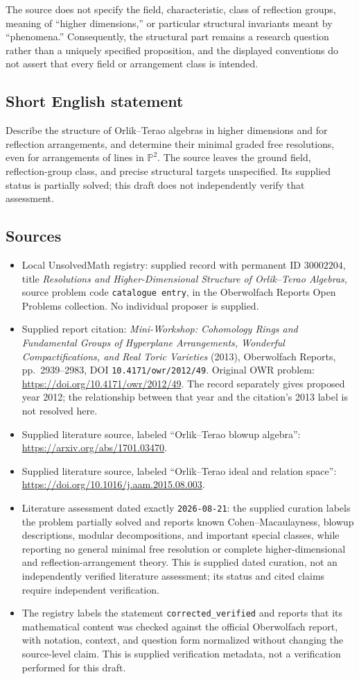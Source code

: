 \documentclass[11pt]{article}
\begin{document}
The source does not specify the field, characteristic, class of reflection groups, meaning of ``higher dimensions,'' or particular structural invariants meant by ``phenomena.'' Consequently, the structural part remains a research question rather than a uniquely specified proposition, and the displayed conventions do not assert that every field or arrangement class is intended.
\subsection{Short English statement}
Describe the structure of Orlik--Terao algebras in higher dimensions and for reflection arrangements, and determine their minimal graded free resolutions, even for arrangements of lines in \(\mathbb P^2\). The source leaves the ground field, reflection-group class, and precise structural targets unspecified. Its supplied status is partially solved; this draft does not independently verify that assessment.
\subsection{Sources}
\begin{itemize}
\item Local UnsolvedMath registry: supplied record with permanent ID \(30002204\), title \emph{Resolutions and Higher-Dimensional Structure of Orlik--Terao Algebras}, source problem code \texttt{catalogue entry}, in the Oberwolfach Reports Open Problems collection. No individual proposer is supplied.
\item Supplied report citation: \emph{Mini-Workshop: Cohomology Rings and Fundamental Groups of Hyperplane Arrangements, Wonderful Compactifications, and Real Toric Varieties} (2013), Oberwolfach Reports, pp.\ 2939--2983, DOI \texttt{10.4171/owr/2012/49}. Original OWR problem: \url{https://doi.org/10.4171/owr/2012/49}. The record separately gives proposed year 2012; the relationship between that year and the citation's 2013 label is not resolved here.
\item Supplied literature source, labeled ``Orlik--Terao blowup algebra'': \url{https://arxiv.org/abs/1701.03470}.
\item Supplied literature source, labeled ``Orlik--Terao ideal and relation space'': \url{https://doi.org/10.1016/j.aam.2015.08.003}.
\item Literature assessment dated exactly \texttt{2026-08-21}: the supplied curation labels the problem partially solved and reports known Cohen--Macaulayness, blowup descriptions, modular decompositions, and important special classes, while reporting no general minimal free resolution or complete higher-dimensional and reflection-arrangement theory. This is supplied dated curation, not an independently verified literature assessment; its status and cited claims require independent verification.
\item The registry labels the statement \texttt{corrected\_verified} and reports that its mathematical content was checked against the official Oberwolfach report, with notation, context, and question form normalized without changing the source-level claim. This is supplied verification metadata, not a verification performed for this draft.
\end{itemize}
\end{document}
